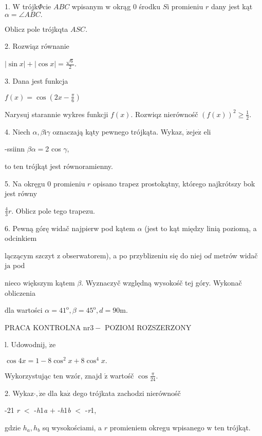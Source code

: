 \documentclass[a4paper,12pt]{article}
\begin{document}
1. $\mathrm{W}$ trójk$\Phi$cie $ABC$ wpisanym $\mathrm{w}$ okrąg $0$ środku $S\mathrm{i}$ promieniu $r$ dany jest kąt $\alpha=\angle ABC.$

Oblicz pole trójkqta $ASC.$

2. Rozwiąz równanie

$|\displaystyle \sin x|+|\cos x|=\frac{\sqrt{6}}{2}.$

3. Dana jest funkcja

$f(x)=\displaystyle \cos(2x-\frac{\pi}{6})$

Narysuj starannie wykres funkcji $f(x)$. Rozwiqz nierównośč $(f(x))^{2}\displaystyle \geq\frac{1}{2}.$

4. Niech $\alpha, \beta \mathrm{i}\gamma$ oznaczają kąty pewnego trójkąta. Wykaz, $\dot{\mathrm{z}}\mathrm{e}\mathrm{j}\mathrm{e}\dot{\mathrm{z}}$ eli

-ssiinn $\beta\alpha =$2 cos $\gamma$,

to ten trójkąt jest równoramienny.

5. Na okręgu $0$ promieniu $r$ opisano trapez prostokątny, którego najkrótszy bok jest równy

$\displaystyle \frac{4}{3}r$. Oblicz pole tego trapezu.

6. Pewną górę widač najpierw pod kątem $\alpha$ (jest to kąt między linią poziomą, a odcinkiem

lączącym szczyt $\mathrm{z}$ obserwatorem), a po przyblizeniu się do niej $\mathrm{o}d$ metrów widač $\mathrm{j}\mathrm{a}$ pod

nieco większym kątem $\beta$. Wyznaczyč względną wysokośč tej góry. Wykonač obliczenia

dla wartości $\alpha=41^{\mathrm{o}}, \beta=45^{\mathrm{o}}, d=90\mathrm{m}.$




PRACA KONTROLNA $\mathrm{n}\mathrm{r} 3-$ POZIOM ROZSZERZONY

l. Udowodnij, $\dot{\mathrm{z}}\mathrm{e}$

$\cos 4x=1-8\cos^{2}x+8\cos^{4}x.$

Wykorzystując ten wzór, znajd $\acute{\mathrm{z}}$ wartośč $\displaystyle \cos\frac{\pi}{24}.$

2. Wykaz$\cdot, \dot{\mathrm{z}}\mathrm{e}$ dla $\mathrm{k}\mathrm{a}\dot{\mathrm{z}}$ dego trójkata zachodzi nierównośč

-21  {\it r} $<$ -{\it h}1{\it a} $+$ -{\it h}1{\it b} $<$ -{\it r}1,

gdzie $h_{a}, h_{b}$ sq wysokościami, a $r$ promieniem okregu wpisanego $\mathrm{w}$ ten trójkąt.
\end{document}
